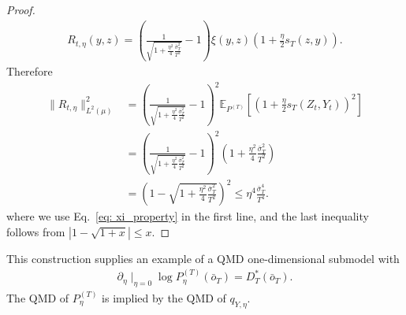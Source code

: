 \documentclass[11pt]{article}
\begin{document}
\begin{proof}
    \begin{align*}
        R_{t,\eta}(y,z) = \left(\frac{1}{\sqrt{1 + \frac{\eta^2}{4}\frac{\bar{\sigma}_T^2}{T^2}}} - 1\right)\xi(y,z)\left(1 + \frac{\eta}{2}s_T(z,y)\right). 
    \end{align*}
    Therefore 
    \begin{align*}
        \|R_{t,\eta}\|^2_{L^2(\mu)} &= \left(\frac{1}{\sqrt{1 + \frac{\eta^2}{4}\frac{\bar{\sigma}_T^2}{T^2}}} - 1\right)^2\mathbb{E}_{P^{(T)}}\left[\left(1 + \frac{\eta}{2}s_T(Z_t,Y_t)\right)^2\right]\\
        &= \left(\frac{1}{\sqrt{1 + \frac{\eta^2}{4}\frac{\bar{\sigma}_T^2}{T^2}}} - 1\right)^2\left(1 + \frac{\eta^2}{4}\frac{\bar{\sigma}_T^2}{T^2}\right)\\
        &= \left(1 - \sqrt{1 + \frac{\eta^2}{4}\frac{\bar{\sigma}_T^2}{T^2}}\right)^2 \leq \eta^4 \frac{\bar{\sigma}_T^4}{T^4}. 
    \end{align*}
    where we use Eq.~\eqref{eq: xi_property} in the first line, and the last inequality follows from $|1-\sqrt{1+x}|\leq x$. 
\end{proof}

This construction supplies an example of a QMD one-dimensional submodel with
\begin{align*}
    \partial_{\eta}\mid_{\eta = 0}\log P^{(T)}_{\eta}(\bar{o}_T) = D^{\ast}_T(\bar{o}_T).
\end{align*}
The QMD of $P_{\eta}^{(T)}$ is implied by the QMD of $q_{Y,\eta}$. 
\end{document}
